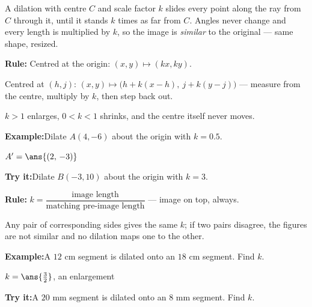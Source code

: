 \documentclass[12pt]{article}
\begin{document}

\noindent\small A dilation with centre $C$ and scale factor $k$ slides every
point along the ray from $C$ through it, until it stands $k$ times as far from
$C$. Angles never change and every length is multiplied by $k$, so the image is
\emph{similar} to the original --- same shape, resized.\normalsize

\begin{formulabox}
\textbf{Rule:} Centred at the origin: $(x, y) \mapsto (kx, ky)$.\par
Centred at $(h, j)$: $(x, y) \mapsto \big(h + k(x - h),\ j + k(y - j)\big)$ ---
measure from the centre, multiply by $k$, then step back out.\par
$k > 1$ enlarges, $0 < k < 1$ shrinks, and the centre itself never moves.
\end{formulabox}
\begin{examplebox}
\textbf{Example:}\quad Dilate $A(4, -6)$ about the origin with $k = 0.5$.

$A' = \ans{(2,\, -3)}$
\end{examplebox}
\begin{tryitbox}
\textbf{Try it:}\quad Dilate $B(-3, 10)$ about the origin with $k = 3$.\\[2pt]
\end{tryitbox}

\begin{formulabox}
\textbf{Rule:} $k = \dfrac{\text{image length}}{\text{matching pre-image
length}}$ --- image on top, always.\par
Any pair of corresponding sides gives the same $k$; if two pairs disagree, the
figures are not similar and no dilation maps one to the other.
\end{formulabox}
\begin{examplebox}
\textbf{Example:}\quad A $12$ cm segment is dilated onto an $18$ cm segment.
Find $k$.

$k = \ans{\frac{3}{2}}$, an enlargement
\end{examplebox}
\begin{tryitbox}
\textbf{Try it:}\quad A $20$ mm segment is dilated onto an $8$ mm segment. Find
$k$.\\[2pt]
\end{tryitbox}
\end{document}
